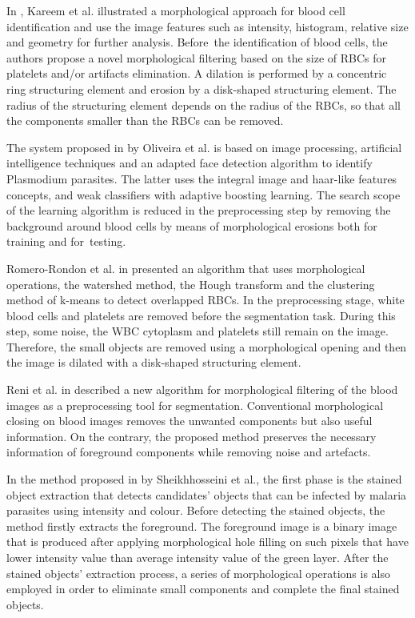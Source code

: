 \documentclass[final,a4paper,12pt,english]{UnicaPhdThesis3}
\begin{document}
In \cite{Kareem2012}, Kareem et al. illustrated a morphological approach for blood cell identification and use the image features such as intensity, histogram, relative size and geometry for further analysis. Before~the identification of blood cells, the authors  propose a novel morphological filtering based on the size of RBCs for platelets and/or artifacts elimination. A dilation is performed by a concentric ring structuring element and erosion by a disk-shaped structuring element. The radius of the structuring element depends on the radius of the RBCs, so that all the components smaller than the RBCs can be removed.

The system proposed in \cite{Oliveira2017} by Oliveira et al. is based on image processing, artificial intelligence techniques and an adapted face detection algorithm to identify Plasmodium parasites. The latter uses the integral image and haar-like features concepts, and weak classifiers with adaptive boosting learning. The search scope of the learning algorithm is reduced in the preprocessing step by removing the background around blood cells by means of morphological erosions both for training and for~testing.

Romero-Rondon et al. in \cite{Romero2016} presented an algorithm that uses morphological operations, the watershed method, the Hough transform and the clustering method of k-means to detect overlapped RBCs. In the preprocessing stage, white blood cells and platelets are removed before the segmentation task. During this step, some noise, the WBC cytoplasm and platelets still remain on the image. 
Therefore, the small objects are removed using a morphological opening and then the image is dilated with a disk-shaped structuring element.

Reni et al. in \cite{Reni2015} described a new algorithm for morphological filtering of the blood images as a preprocessing tool for segmentation. Conventional morphological closing on blood images removes the unwanted components but also useful information. On the contrary, the proposed method preserves the necessary information of foreground components while removing noise and artefacts.

In the method proposed in \cite{Sheik2013} by Sheikhhosseini et al., the first phase is the stained object extraction that detects candidates' objects that can be infected by malaria parasites using intensity and colour. Before detecting the stained objects, the method firstly extracts the foreground. The foreground image is a binary image that is produced after applying morphological hole filling on such pixels that have lower intensity value than average intensity value of the green layer. After the stained objects' extraction process, a series of morphological operations is also employed in order to eliminate small components and complete the final stained objects.
\end{document}
